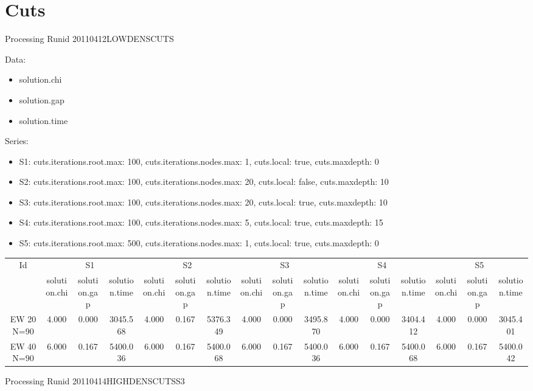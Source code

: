 \documentclass[landscape, 12pt]{report}
\begin{document}
\section*{Cuts}

Processing Runid 20110412LOWDENSCUTS

Data:
\begin{itemize}
\item solution.chi
\item solution.gap
\item solution.time
\end{itemize}
Series:
\begin{itemize}
\item S1: cuts.iterations.root.max: 100, cuts.iterations.nodes.max: 1, cuts.local: true, cuts.maxdepth: 0
\item S2: cuts.iterations.root.max: 100, cuts.iterations.nodes.max: 20, cuts.local: false, cuts.maxdepth: 10
\item S3: cuts.iterations.root.max: 100, cuts.iterations.nodes.max: 20, cuts.local: true, cuts.maxdepth: 10
\item S4: cuts.iterations.root.max: 100, cuts.iterations.nodes.max: 5, cuts.local: true, cuts.maxdepth: 15
\item S5: cuts.iterations.root.max: 500, cuts.iterations.nodes.max: 1, cuts.local: true, cuts.maxdepth: 0
\end{itemize}
\begin{tabular}{|c|ccc|ccc|ccc|ccc|ccc|}
\hline
\multicolumn{1}{|c|}{Id} & \multicolumn{3}{|c|}{S1} & \multicolumn{3}{|c|}{S2} & \multicolumn{3}{|c|}{S3} & \multicolumn{3}{|c|}{S4} & \multicolumn{3}{|c|}{S5}
\\
 & solution.chi & solution.gap & solution.time & solution.chi & solution.gap & solution.time & solution.chi & solution.gap & solution.time & solution.chi & solution.gap & solution.time & solution.chi & solution.gap & solution.time
\\
\hline
EW 20 N=90 & 4.000 & 0.000 & 3045.568 & 4.000 & 0.167 & 5376.349 & 4.000 & 0.000 & 3495.870 & 4.000 & 0.000 & 3404.412 & 4.000 & 0.000 & 3045.401
\\
EW 40 N=90 & 6.000 & 0.167 & 5400.036 & 6.000 & 0.167 & 5400.068 & 6.000 & 0.167 & 5400.036 & 6.000 & 0.167 & 5400.068 & 6.000 & 0.167 & 5400.042
\\
\hline 
 \end{tabular}





Processing Runid 20110414HIGHDENSCUTSS3
\end{document}
